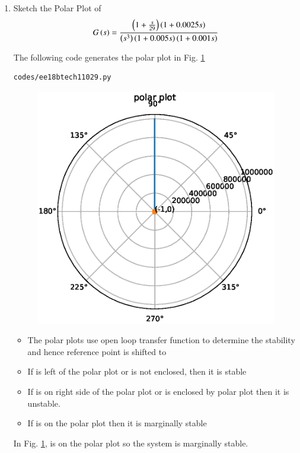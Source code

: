 \begin{enumerate}[label=\thesubsection.\arabic*.,ref=\thesubsection.\theenumi]
\item
Sketch the Polar Plot of
\begin{align}
G\left(s\right) = \frac{\left(1+\frac{s}{29}\right)\left(1+0.0025s\right)}{\left(s^{3}\right)\left(1+0.005s\right)\left(1+0.001s\right)}
\end{align}

\solution 
%
The following code generates the polar plot in Fig.   \ref{fig:ee18btech11029}

\begin{lstlisting}
codes/ee18btech11029.py
\end{lstlisting}

\begin{figure}[!h]
\centering
  \includegraphics[width=\columnwidth]{./figs/ee18btech11029.eps}
  \caption{}
  \label{fig:ee18btech11029}
\end{figure}

\begin{itemize}
    \item The polar plots use open loop transfer function to determine the stability and hence reference point is shifted to 
    \item If  is left of the polar plot or  is not enclosed, then it is stable
    \item If  is on right side of the polar plot or  is enclosed by polar plot then it is unstable. 
    \item If  is on the polar plot then it is marginally stable
    
\end{itemize}

In Fig.   \ref{fig:ee18btech11029},   is on the polar plot so the system is marginally stable.
   
\end{enumerate}
